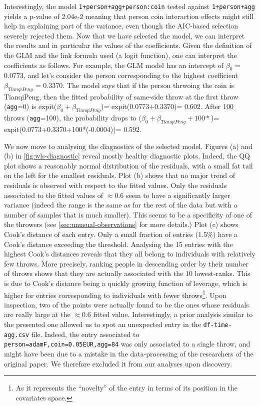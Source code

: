 \documentclass[a4paper, 12pt,oneside]{article}
\begin{document}
		Interestingly, the model \texttt{1+person+agg+person:coin} tested against \texttt{1+person+agg} yields a p-value of 2.04e-2 meaning that person coin interaction effects might still help in explaining part of the variance, even though the AIC-based selection severely rejected them. 
		Now that we have selected the model, we can interpret the results and in particular the values of the coefficients. Given the definition of the GLM and the link formula used (a logit function), one can interpret the coefficients as follows. For example, the GLM model has an intercept of $\beta_0$ = 0.0773, and let's consider the person corresponding to the highest coefficient $\beta_{TianqiPeng}$ = 0.3370. The model says that if the  person thrwoing the coin is TianqiPeng, then the fitted probability of same-side throw at the first throw (\texttt{agg}=0) is expit($\beta_0+\beta_{TianqiPeng}$)= expit(0.0773+0.3370)= 0.602. After 100 throws (\texttt{agg}=100), the probability drops to ($\beta_0+\beta_{TianqiPeng}+100*$)= expit(0.0773+0.3370+100*(-0.0004))= 0.592.


		We now move to analysing the diagnostics of the selected model. Figures (a) and (b) in \ref{fig:wls-diagnostic} reveal mostly healthy diagnostic plots. Indeed, the QQ plot shows a reasonably normal distribution of the residuals, with a small fat tail on the left for the smallest residuals. Plot (b) shows that no major trend of residuals is observed with respect to the fitted values. Only the residuals associated to the fitted values of $\approx 0.6$ seem to have a significantly larger variance (indeed the range is the same as for the rest of the data but with a number of samples that is much smaller). This seems to be a specificity of one of the throwers (see \ref{sec:unusual-observations} for more details.)
		Plot (c) shows Cook's distance of each entry. Only a small fraction of entries (1.5\%) have a Cook's distance exceeding the threshold. Analysing the 15 entries with the highest Cook's distances reveals that they all belong to individuals with relatively few throws. More precisely, ranking people in descending order by their number of throws shows that they are actually associated with the 10 lowest-ranks. This is due to Cook's distance being a quickly growing function of leverage, which is higher for entries corresponding to individuals with fewer throws\footnote{As it represents the ``novelty'' of the entry in terms of its position in the covariates space.}. Upon inspection, two of the points were actually found to be the ones whose residuals are really large at the $\approx 0.6$ fitted value.
		Interestingly, a prior analysis similar to the presented one allowed us to spot an unexpected entry in the \texttt{df-time-agg.csv} file. Indeed, the entry associated to \texttt{person=adamF,coin=0.05EUR,agg=84} was only associated to a single throw, and might have been due to a mistake in the data-processing of the researchers of the original paper. We therefore excluded it from our analyses upon discovery. 
\end{document}
